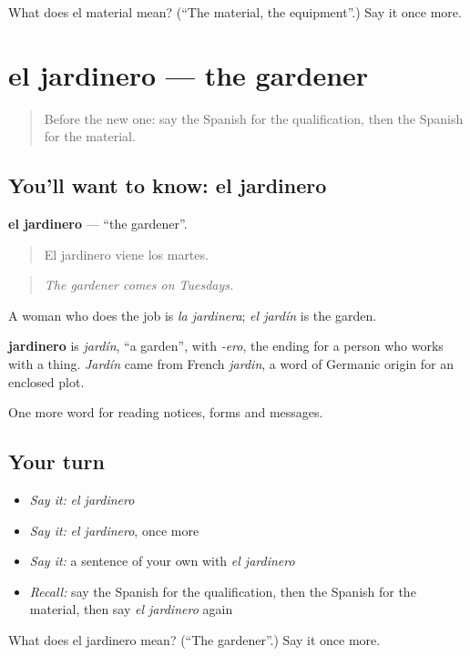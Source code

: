 \begin{tcolorbox}[breakable,colback=teal!4,colframe=teal!35!black,title={Before you move on}]
What does el material mean? (\textquotedblleft{}The material, the equipment\textquotedblright{}.) Say it once more.
\end{tcolorbox}
\section[el jardinero]{el jardinero — the gardener}

\label{lesson:ES-C475-jardinero}



\begin{quote}
Before the new one: say the Spanish for the qualification, then the Spanish for the material.
\end{quote}

\subsection*{You'll want to know: el jardinero}
\textbf{el jardinero} — \textquotedblleft{}the gardener\textquotedblright{}.

\begin{quote}
El jardinero viene los martes.
\end{quote}

\begin{quote}
\emph{The gardener comes on Tuesdays.}
\end{quote}

A woman who does the job is \emph{la jardinera}; \emph{el jardín} is the garden.

\begin{cousinweb}
\textbf{jardinero} is \emph{jardín}, \textquotedblleft{}a garden\textquotedblright{}, with \emph{-ero}, the ending for a person who works with a thing. \emph{Jardín} came from French \emph{jardin}, a word of Germanic origin for an enclosed plot.
\end{cousinweb}

\begin{grammarlens}[title={What you've built}]
One more word for reading notices, forms and messages.
\end{grammarlens}

\subsection*{Your turn}
\begin{itemize}
\raggedright
  \item \emph{Say it:} \emph{el jardinero}
  \item \emph{Say it:} \emph{el jardinero}, once more
  \item \emph{Say it:} a sentence of your own with \emph{el jardinero}
  \item \emph{Recall:} say the Spanish for the qualification, then the Spanish for the material, then say \emph{el jardinero} again
\end{itemize}

\begin{tcolorbox}[breakable,colback=teal!4,colframe=teal!35!black,title={Before you move on}]
What does el jardinero mean? (\textquotedblleft{}The gardener\textquotedblright{}.) Say it once more.
\end{tcolorbox}
